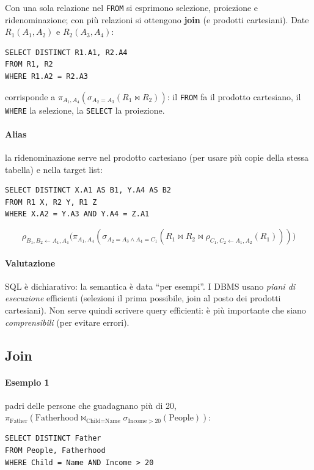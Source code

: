 \documentclass[a4paper,12pt]{article}
\begin{document}
Con una sola relazione nel \texttt{FROM} si esprimono selezione, proiezione e
ridenominazione; con più relazioni si ottengono \textbf{join} (e prodotti
cartesiani). Date $R_1(A_1,A_2)$ e $R_2(A_3,A_4)$:
\begin{verbatim}
SELECT DISTINCT R1.A1, R2.A4
FROM R1, R2
WHERE R1.A2 = R2.A3
\end{verbatim}
corrisponde a $\pi_{A_1,A_4}(\sigma_{A_2=A_3}(R_1 \bowtie R_2))$: il
\texttt{FROM} fa il prodotto cartesiano, il \texttt{WHERE} la selezione, la
\texttt{SELECT} la proiezione.

\paragraph{Alias} la ridenominazione serve nel prodotto cartesiano (per usare
più copie della stessa tabella) e nella target list:
\begin{verbatim}
SELECT DISTINCT X.A1 AS B1, Y.A4 AS B2
FROM R1 X, R2 Y, R1 Z
WHERE X.A2 = Y.A3 AND Y.A4 = Z.A1
\end{verbatim}
\[
\rho_{B_1,B_2 \leftarrow A_1,A_4}\bigl(\pi_{A_1,A_4}(\sigma_{A_2=A_3 \land
A_4=C_1}(R_1 \bowtie R_2 \bowtie \rho_{C_1,C_2 \leftarrow A_1,A_2}(R_1)))\bigr)
\]

\paragraph{Valutazione} SQL è dichiarativo: la semantica è data ``per
esempi''. I DBMS usano \emph{piani di esecuzione} efficienti (selezioni il
prima possibile, join al posto dei prodotti cartesiani). Non serve quindi
scrivere query efficienti: è più importante che siano \emph{comprensibili}
(per evitare errori).

\subsection{Join}

\paragraph{Esempio 1} padri delle persone che guadagnano più di 20,
$\pi_{\text{Father}}(\text{Fatherhood} \bowtie_{\text{Child}=\text{Name}}
\sigma_{\text{Income}>20}(\text{People}))$:
\begin{verbatim}
SELECT DISTINCT Father
FROM People, Fatherhood
WHERE Child = Name AND Income > 20
\end{verbatim}
\end{document}
